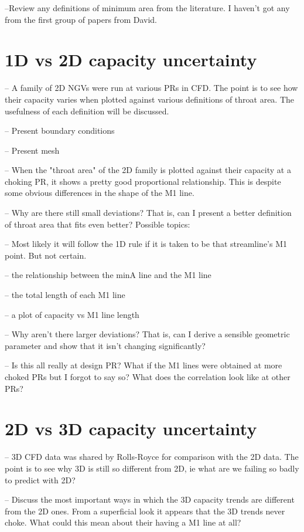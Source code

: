 \documentclass[11pt, twoside]{report}
\begin{document}
 
 --Review any definitions of minimum area from the literature. I haven't got any from the first group of papers from David.


\section{1D vs 2D capacity uncertainty}

-- A family of 2D NGVs were run at various PRs in CFD. The point is to see how their capacity varies when plotted against various definitions of throat area. The usefulness of each definition will be discussed.

-- Present boundary conditions

-- Present mesh

-- When the "throat area" of the 2D family is plotted against their capacity at a choking PR, it shows a pretty good proportional relationship. This is despite some obvious differences in the shape of the M1 line.

-- Why are there still small deviations? That is, can I present a better definition of throat area that fits even better? Possible topics:

 -- Most likely it will follow the 1D rule if it is taken to be that streamline's M1 point. But not certain.
 
 -- the relationship between the minA line and the M1 line
 
 -- the total length of each M1 line
 
 -- a plot of capacity vs M1 line length

-- Why aren't there larger deviations? That is, can I derive a sensible geometric parameter and show that it isn't changing significantly?

-- Is this all really at design PR? What if the M1 lines were obtained at more choked PRs but I forgot to say so? What does the correlation look like at other PRs?


\section{2D vs 3D capacity uncertainty}

-- 3D CFD data was shared by Rolls-Royce for comparison with the 2D data. The point is to see why 3D is still so different from 2D, ie what are we failing so badly to predict with 2D?

-- Discuss the most important ways in which the 3D capacity trends are different from the 2D ones. From a superficial look it appears that the 3D trends never choke. What could this mean about their having a M1 line at all?
\end{document}
